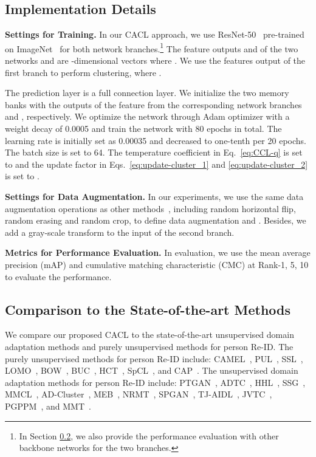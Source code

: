 \documentclass[journal]{IEEEtran}
\newcommand{\myparagraph}[1]{\noindent\textbf{#1.}}
\begin{document}
\subsection{Implementation Details}

\myparagraph{Settings for Training} In our CACL approach, we use ResNet-50~\cite{he:CVPR16resnet} pre-trained on ImageNet~\cite{Krizhevsky:NIPS12} for both  network branches.\footnote{In Section \ref{subsec:comp-to-sota}, we also provide the performance evaluation with other backbone networks for the two branches.}
The feature outputs  and  of the two networks  and  are -dimensional vectors where . We use the features output  of the first branch  to perform clustering, where . 

The prediction layer  is a  full connection layer. 
We initialize the two memory banks with the outputs of the feature from the corresponding network branches  and , respectively. 
We optimize the network through Adam optimizer \cite{Kingma:arXiv2014} with a weight decay of 0.0005 and train the network with 80 epochs in total. The learning rate is initially set as 0.00035 and decreased to one-tenth per 20 epochs. 
The batch size is set to 64. 
The temperature coefficient  in Eq.~\eqref{eq:CCL-q} is set to  and the update factor  in Eqs.~\eqref{eq:update-cluster_1} and \eqref{eq:update-cluster_2} is set to .




\myparagraph{Settings for Data Augmentation} 
In our experiments, we use the same data augmentation operations as other methods~\cite{Ge:NIPS20,GE:ICLR20}, including random horizontal flip, random erasing and random crop, to define data augmentation  and . Besides, we add a gray-scale transform to the input of the second branch.


\myparagraph{Metrics for Performance Evaluation} In evaluation, we use the mean average precision (mAP) and cumulative matching characteristic (CMC) at Rank-1, 5, 10 to evaluate the performance. 




\subsection{Comparison to the State-of-the-art Methods} \label{subsec:comp-to-sota}

We compare our proposed CACL to the state-of-the-art unsupervised domain adaptation methods and purely unsupervised methods for person Re-ID. The purely unsupervised methods for person Re-ID include: CAMEL~\cite{Yu:ICCV17}, PUL~\cite{Fan:TOMM18}, SSL~\cite{Lin:CVPR20}, LOMO~\cite{Liao:CVPR15}, BOW~\cite{Zheng:ICCV15}, BUC~\cite{Lin:AAAI19},  HCT~\cite{Zeng:CVPR20}, SpCL~\cite{Ge:NIPS20}, and CAP~\cite{Wang:AAAI20}. The unsupervised domain adaptation methods for person Re-ID include: PTGAN~\cite{Wei:CVPR18}, ADTC~\cite{ji:ECCV20}, HHL~\cite{Zhong:ECCV18},  SSG~\cite{Fu:ICCV19}, MMCL~\cite{Wang:CVPR20}, AD-Cluster~\cite{zhai:CVPR20}, MEB~\cite{zhai:ECCV20}, NRMT~\cite{Zhao:ECCV20}, SPGAN~\cite{Deng:CVPR18}, TJ-AIDL~\cite{Wang:CVPR18}, JVTC~\cite{Li:ECCV20},  PGPPM~\cite{Yang:arXiv18}, and MMT~\cite{GE:ICLR20}.
\end{document}
